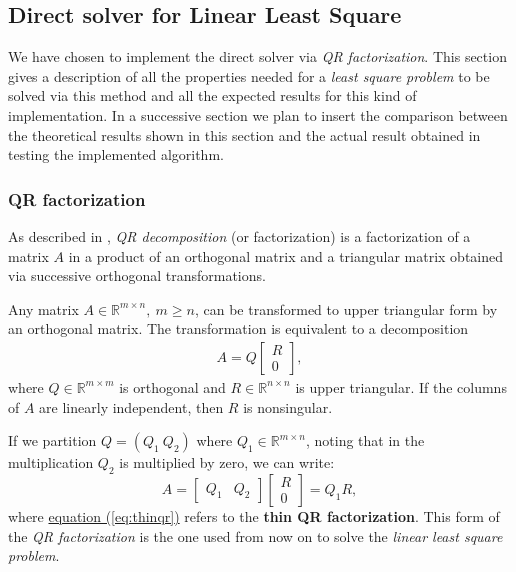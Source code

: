 \subsection{Direct solver for Linear Least Square}
\label{sec:qr}
We have chosen to implement the direct solver via \textit{QR factorization}. This section gives a description of all the properties needed for a \textit{least square problem} to be solved via this method and all the expected results for this kind of implementation. In a successive section we plan to insert the comparison between the theoretical results shown in this section and the actual result obtained in testing the implemented algorithm.
\subsubsection{QR factorization}
\label{subsec:qr}
As described in \parencite[Chap. 5]{elden}, \textit{QR decomposition} (or factorization) is a factorization of a matrix $A$ in a product of an orthogonal matrix and a triangular matrix obtained via successive orthogonal transformations.

\begin{thm}
\label{thm:qr}
Any matrix $A\in \mathbb{R}^{m\times n},\ m\geq n$, can be transformed to upper triangular form by an orthogonal matrix. The transformation is equivalent to a decomposition
\begin{align*}
    A = Q\begin{bmatrix}R \\ 0\end{bmatrix},
\end{align*} where $Q\in \mathbb{R}^{m\times m}$ is orthogonal and $R\in \mathbb{R}^{n\times n}$ is upper triangular. If the columns of $A$ are linearly independent, then $R$ is nonsingular.
\end{thm}
If we partition $Q = (Q_1\ Q_2)$ where $Q_1\in \mathbb{R}^{m\times n}$, noting that in the multiplication $Q_2$ is multiplied by zero, we can write:
\begin{equation}
\label{eq:thinqr}
    A = \begin{bmatrix}Q_1 & Q_2\end{bmatrix}\begin{bmatrix}R \\ 0\end{bmatrix} = Q_1R,
\end{equation}
where \hyperref[eq:thinqr]{equation (\ref{eq:thinqr})} refers to the \textbf{thin QR factorization}. This form of the \textit{QR factorization} is the one used from now on to solve the \textit{linear least square problem}.

